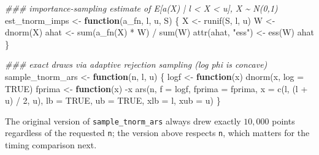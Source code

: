 \documentclass[
  letterpaper,
  DIV=11,
  numbers=noendperiod]{scrreprt}
\newenvironment{Shaded}{\begin{snugshade}}{\end{snugshade}}
\newcommand{\AttributeTok}[1]{\textcolor[rgb]{0.40,0.45,0.13}{#1}}
\newcommand{\ConstantTok}[1]{\textcolor[rgb]{0.56,0.35,0.01}{#1}}
\newcommand{\ControlFlowTok}[1]{\textcolor[rgb]{0.00,0.23,0.31}{\textbf{#1}}}
\newcommand{\DecValTok}[1]{\textcolor[rgb]{0.68,0.00,0.00}{#1}}
\newcommand{\DocumentationTok}[1]{\textcolor[rgb]{0.37,0.37,0.37}{\textit{#1}}}
\newcommand{\FunctionTok}[1]{\textcolor[rgb]{0.28,0.35,0.67}{#1}}
\newcommand{\NormalTok}[1]{\textcolor[rgb]{0.00,0.23,0.31}{#1}}
\newcommand{\OtherTok}[1]{\textcolor[rgb]{0.00,0.23,0.31}{#1}}
\newcommand{\SpecialCharTok}[1]{\textcolor[rgb]{0.37,0.37,0.37}{#1}}
\newcommand{\StringTok}[1]{\textcolor[rgb]{0.13,0.47,0.30}{#1}}
\begin{document}
\begin{Shaded}
\begin{Highlighting}[]
\DocumentationTok{\#\#\# importance{-}sampling estimate of E[a(X) | l \textless{} X \textless{} u], X \textasciitilde{} N(0,1)}
\NormalTok{est\_tnorm\_imps }\OtherTok{\textless{}{-}} \ControlFlowTok{function}\NormalTok{(a\_fn, l, u, S) \{}
\NormalTok{    X }\OtherTok{\textless{}{-}} \FunctionTok{runif}\NormalTok{(S, l, u)}
\NormalTok{    W }\OtherTok{\textless{}{-}} \FunctionTok{dnorm}\NormalTok{(X)}
\NormalTok{    ahat }\OtherTok{\textless{}{-}} \FunctionTok{sum}\NormalTok{(}\FunctionTok{a\_fn}\NormalTok{(X) }\SpecialCharTok{*}\NormalTok{ W) }\SpecialCharTok{/} \FunctionTok{sum}\NormalTok{(W)}
    \FunctionTok{attr}\NormalTok{(ahat, }\StringTok{"ess"}\NormalTok{) }\OtherTok{\textless{}{-}} \FunctionTok{ess}\NormalTok{(W)}
\NormalTok{    ahat}
\NormalTok{\}}

\DocumentationTok{\#\#\# exact draws via adaptive rejection sampling (log phi is concave)}
\NormalTok{sample\_tnorm\_ars }\OtherTok{\textless{}{-}} \ControlFlowTok{function}\NormalTok{(n, l, u) \{}
\NormalTok{    logf   }\OtherTok{\textless{}{-}} \ControlFlowTok{function}\NormalTok{(x) }\FunctionTok{dnorm}\NormalTok{(x, }\AttributeTok{log =} \ConstantTok{TRUE}\NormalTok{)}
\NormalTok{    fprima }\OtherTok{\textless{}{-}} \ControlFlowTok{function}\NormalTok{(x) }\SpecialCharTok{{-}}\NormalTok{x}
    \FunctionTok{ars}\NormalTok{(n, }\AttributeTok{f =}\NormalTok{ logf, }\AttributeTok{fprima =}\NormalTok{ fprima, }\AttributeTok{x =} \FunctionTok{c}\NormalTok{(l, (l }\SpecialCharTok{+}\NormalTok{ u) }\SpecialCharTok{/} \DecValTok{2}\NormalTok{, u),}
        \AttributeTok{lb =} \ConstantTok{TRUE}\NormalTok{, }\AttributeTok{ub =} \ConstantTok{TRUE}\NormalTok{, }\AttributeTok{xlb =}\NormalTok{ l, }\AttributeTok{xub =}\NormalTok{ u)}
\NormalTok{\}}
\end{Highlighting}
\end{Shaded}

The original version of \texttt{sample\_tnorm\_ars} always drew exactly
\(10{,}000\) points regardless of the requested \texttt{n}; the version
above respects \texttt{n}, which matters for the timing comparison next.
\end{document}
